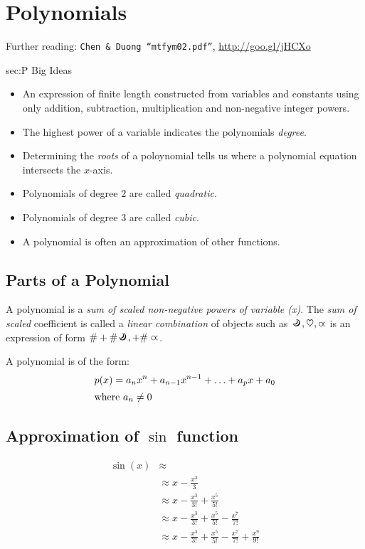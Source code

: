 \chapter{Polynomials}
\label{chap:P}
Further reading: \texttt{Chen \& Duong ``mtfym02.pdf''}, \url{http://goo.gl/jHCXo}

\begin{bigideas}{sec:P Big Ideas}
\begin{itemize}
  \item An expression of finite length constructed from variables and constants
        using only addition, subtraction, multiplication and non-negative integer
        powers.
  \item The highest power of a variable indicates the polynomials \emph{degree}.
  \item Determining the \emph{roots} of a poloynomial tells us where a
        polynomial equation intersects the $x$-axis.
  \item Polynomials of degree $2$ are called \emph{quadratic}.
  \item Polynomials of degree $3$ are called \emph{cubic}.
  \item A polynomial is often an approximation of other functions.
\end{itemize}
\end{bigideas}

\section{Parts of a Polynomial}
\label{sec:Parts of a Polynomial}
A polynomial is a \emph{sum of scaled non-negative powers of variable (x)}. The
\emph{sum of scaled} coefficient is called a \emph{linear combination} of objects
such as $\banana, \heartsuit, \fish$ is an expression of form $\# + \#\banana, + \#\fish$.

A polynomial is of the form:
\begin{align}
  p(x) & = a_nx^n + a_{n-1}x^{n-1} + \ldots + a_px+a_0 \\
  \intertext{where $a_n \neq 0$}
\end{align}

\section{Approximation of $\sin$ function}
\label{sec:Approximation of sin function}
\begin{align}
  \sin(x) & \approx \nonumber \\
    & \approx x - \frac{x^3}{3} \\
    & \approx x - \frac{x^3}{3!} + \frac{x^5}{5!} \\
    & \approx x - \frac{x^3}{3!} + \frac{x^5}{5!} - \frac{x^7}{7!} \\
    & \approx x - \frac{x^3}{3!} + \frac{x^5}{5!} - \frac{x^7}{7!} + \frac{x^9}{9!} \\ 
\end{align}

